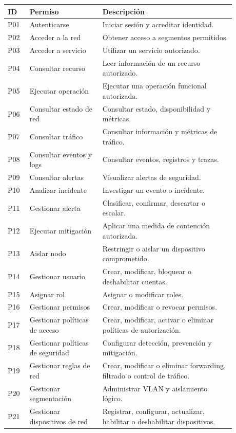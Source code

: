 \documentclass[11pt,a4paper]{article}
\begin{document}
\begin{longtable}{p{0.08\linewidth}p{0.29\linewidth}p{0.51\linewidth}}
\toprule
ID & Permiso & Descripción\\
\midrule
P01 & Autenticarse & Iniciar sesión y acreditar identidad.\\
P02 & Acceder a la red & Obtener acceso a segmentos permitidos.\\
P03 & Acceder a servicio & Utilizar un servicio autorizado.\\
P04 & Consultar recurso & Leer información de un recurso autorizado.\\
P05 & Ejecutar operación & Ejecutar una operación funcional autorizada.\\
P06 & Consultar estado de red & Consultar estado, disponibilidad y métricas.\\
P07 & Consultar tráfico & Consultar información y métricas de tráfico.\\
P08 & Consultar eventos y logs & Consultar eventos, registros y trazas.\\
P09 & Consultar alertas & Visualizar alertas de seguridad.\\
P10 & Analizar incidente & Investigar un evento o incidente.\\
P11 & Gestionar alerta & Clasificar, confirmar, descartar o escalar.\\
P12 & Ejecutar mitigación & Aplicar una medida de contención autorizada.\\
P13 & Aislar nodo & Restringir o aislar un dispositivo comprometido.\\
P14 & Gestionar usuario & Crear, modificar, bloquear o deshabilitar cuentas.\\
P15 & Asignar rol & Asignar o modificar roles.\\
P16 & Gestionar permisos & Crear, modificar o revocar permisos.\\
P17 & Gestionar políticas de acceso & Crear, modificar, activar o eliminar políticas de autorización.\\
P18 & Gestionar políticas de seguridad & Configurar detección, prevención y mitigación.\\
P19 & Gestionar reglas de red & Crear, modificar o eliminar forwarding, filtrado o control de tráfico.\\
P20 & Gestionar segmentación & Administrar VLAN y aislamiento lógico.\\
P21 & Gestionar dispositivos de red & Registrar, configurar, actualizar, habilitar o deshabilitar dispositivos.\\

\end{longtable}
\end{document}

